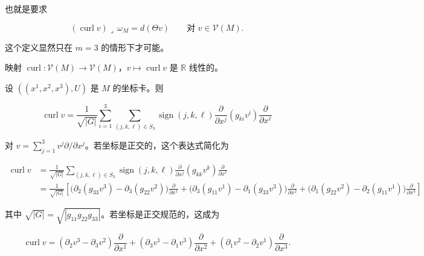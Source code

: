 也就是要求

\begin{equation}
(\operatorname{curl} v) \lrcorner\, \omega_{M} = d(\Theta v) \qquad \text{对 } v \in \mathcal{V}(M) .\tag{6.24}
\end{equation}

这个定义显然只在 $ m = 3 $ 的情形下才可能。

\begin{remark}

\begin{items}
\item

映射 $ \operatorname{curl} : \mathcal{V}(M) \to \mathcal{V}(M) $，$ v \mapsto \operatorname{curl} v $ 是 $ \mathbb{R} $ 线性的。

\item

设 $ ((x^{1}, x^{2}, x^{3}), U) $ 是 $ M $ 的坐标卡。则

\[
\operatorname{curl} v = \frac{1}{\sqrt{|G|}} \sum_{i=1}^{3} \sum_{(j,k,\ell) \in S_{3}} \operatorname{sign}(j, k, \ell) \frac{\partial}{\partial x^{j}} (g_{ki} v^{i}) \frac{\partial}{\partial x^{\ell}}
\]

对 $ v = \sum_{j=1}^{3} v^{j} \partial/\partial x^{j} $。若坐标是正交的，这个表达式简化为

\begin{equation*}
\begin{aligned}
\operatorname{curl} v &= \frac{1}{\sqrt{|G|}} \sum_{(j,k,\ell) \in S_{3}} \operatorname{sign}(j, k, \ell) \frac{\partial}{\partial x^{j}} (g_{kk} v^{k}) \frac{\partial}{\partial x^{\ell}} \\ &= \frac{1}{\sqrt{|G|}} \left[ \bigl(\partial_{2}(g_{33} v^{3}) - \partial_{3}(g_{22} v^{2})\bigr) \frac{\partial}{\partial x^{1}} + \bigl(\partial_{3}(g_{11} v^{1}) - \partial_{1}(g_{33} v^{3})\bigr) \frac{\partial}{\partial x^{2}} + \bigl(\partial_{1}(g_{22} v^{2}) - \partial_{2}(g_{11} v^{1})\bigr) \frac{\partial}{\partial x^{3}} \right]
\end{aligned}
\end{equation*}

其中 $ \sqrt{|G|} = \sqrt{|g_{11} g_{22} g_{33}|} $。若坐标是正交规范的，这成为

\[
\operatorname{curl} v = (\partial_{2} v^{3} - \partial_{3} v^{2}) \frac{\partial}{\partial x^{1}} + (\partial_{3} v^{1} - \partial_{1} v^{3}) \frac{\partial}{\partial x^{2}} + (\partial_{1} v^{2} - \partial_{2} v^{1}) \frac{\partial}{\partial x^{3}} .
\]


\end{items}
\end{remark}
